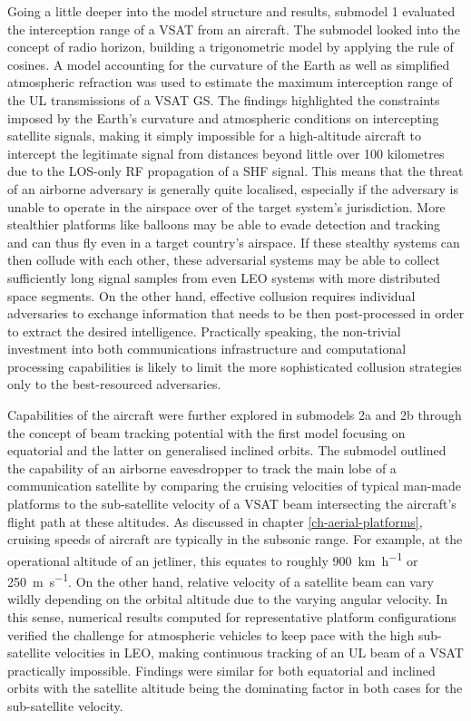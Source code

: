 \documentclass[english, 12pt, a4paper, elec, utf8, a-1b, online]{aaltothesis}
\begin{document}
Going a little deeper into the model structure and results, submodel 1 evaluated the interception range of a VSAT from an aircraft. The submodel looked into the concept of radio horizon, building a trigonometric model by applying the rule of cosines.
A model accounting for the curvature of the Earth as well as simplified atmospheric refraction was used to estimate the maximum interception range of the UL transmissions of a VSAT GS. The findings highlighted the constraints imposed by the Earth's curvature and atmospheric conditions on intercepting satellite signals, making it simply impossible for a high-altitude aircraft to intercept the legitimate signal from distances beyond little over 100 kilometres due to the LOS-only RF propagation of a SHF signal.
This means that the threat of an airborne adversary is generally quite localised, especially if the adversary is unable to operate in the airspace over of the target system's jurisdiction. More stealthier platforms like balloons may be able to evade detection and tracking and can thus fly even in a target country's airspace. If these stealthy systems can then collude with each other, these adversarial systems may be able to collect sufficiently long signal samples from even LEO systems with more distributed space segments. On the other hand, effective collusion requires individual adversaries to exchange information that needs to be then post-processed in order to extract the desired intelligence. Practically speaking, the non-trivial investment into both communications infrastructure and computational processing capabilities is likely to limit the more sophisticated collusion strategies only to the best-resourced adversaries.

Capabilities of the aircraft were further explored in submodels 2a and 2b through the concept of beam tracking potential with the first model focusing on equatorial and the latter on generalised inclined orbits. The submodel outlined the capability of an airborne eavesdropper to track the main lobe of a communication satellite by comparing the cruising velocities of typical man-made platforms to the sub-satellite velocity of a VSAT beam intersecting the aircraft's flight path at these altitudes.
As discussed in chapter \ref{ch-aerial-platforms}, cruising speeds of aircraft are typically in the subsonic range.
For example, at the operational altitude of an jetliner, this equates to roughly \SI[per-mode=repeated-symbol]{900}{\kilo\meter\per\hour} or \SI[per-mode=repeated-symbol]{250}{\meter\per\second}.
On the other hand, relative velocity of a satellite beam can vary wildly depending on the orbital altitude due to the varying angular velocity.
In this sense, numerical results computed for representative platform configurations verified the challenge for atmospheric vehicles to keep pace with the high sub-satellite velocities in LEO, making continuous tracking of an UL beam of a VSAT practically impossible. Findings were similar for both equatorial and inclined orbits with the satellite altitude being the dominating factor in both cases for the sub-satellite velocity.
\end{document}
